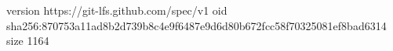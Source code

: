 version https://git-lfs.github.com/spec/v1
oid sha256:870753a11ad8b2d739b8c4e9f6487e9d6d80b672fcc58f70325081ef8bad6314
size 1164
